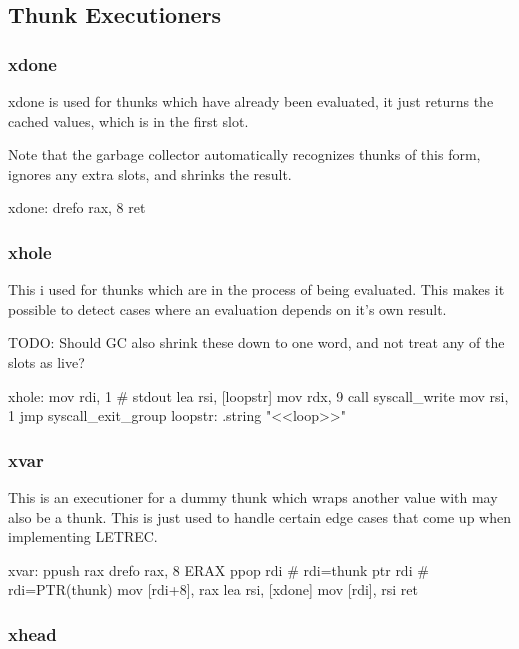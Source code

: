 \subsection{Thunk Executioners}

\subsubsection{xdone}

xdone is used for thunks which have already been evaluated, it just
returns the cached values, which is in the first slot.

Note that the garbage collector automatically recognizes thunks of this
form, ignores any extra slots, and shrinks the result.

\begin{asm}
xdone:
	drefo	rax, 8
	ret
\end{asm}

\subsubsection{xhole}

This i used for thunks which are in the process of being evaluated.
This makes it possible to detect cases where an evaluation depends on
it's own result.

TODO: Should GC also shrink these down to one word, and not treat any
of the slots as live?

\begin{asm}
xhole:
	mov	rdi, 1 # stdout
	lea	rsi, [loopstr]
	mov	rdx, 9
	call	syscall_write
	mov	rsi, 1
	jmp	syscall_exit_group
loopstr: .string "<<loop>>\n"
\end{asm}

\subsubsection{xvar}

This is an executioner for a dummy thunk which wraps another value with
may also be a thunk.  This is just used to handle certain edge cases
that come up when implementing LETREC.

\begin{asm}
xvar:
	ppush	rax
	drefo	rax, 8
	ERAX
	ppop	rdi           # rdi=thunk
	ptr	rdi           # rdi=PTR(thunk)
	mov	[rdi+8], rax
	lea	rsi, [xdone]
	mov	[rdi], rsi
	ret
\end{asm}

\subsubsection{xhead}

